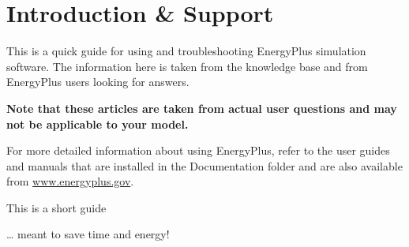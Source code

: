 \chapter{Introduction \& Support}\label{introduction-support}

This is a quick guide for using and troubleshooting EnergyPlus simulation software. The information here is taken from the knowledge base and from EnergyPlus users looking for answers.

\textbf{Note that these articles are taken from actual user questions and may not be applicable to your model.}

For more detailed information about using EnergyPlus, refer to the user guides and manuals that are installed in the Documentation folder and are also available from \href{http://www.energyplus.gov}{www.energyplus.gov}.

This is a short guide

\ldots{} meant to save time and energy!
